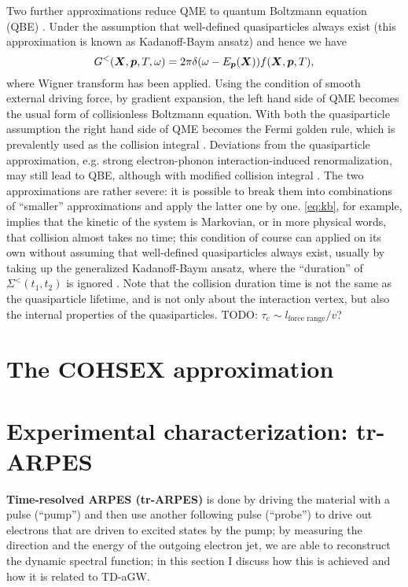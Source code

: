 \documentclass[hyperref, a4paper]{article}
\newcommand*{\concept}[1]{{\textbf{#1}}}
\begin{document}
Two further approximations reduce QME to quantum Boltzmann equation (QBE)
\cite{rammer1986quantum,haug2008quantum}.
Under the assumption that well-defined quasiparticles always exist
(this approximation is known as Kadanoff-Baym ansatz) and hence we have 
\begin{equation}
    G^<(\vb*{X}, \vb*{p}, T, \omega) = 2\pi \delta(\omega - E_{\vb*{p}}(\vb*{X})) f(\vb*{X}, \vb*{p}, T),
    \label{eq:kb}
\end{equation}
where Wigner transform has been applied.
Using the condition of smooth external driving force,
by gradient expansion, the left hand side of QME becomes 
the usual form of collisionless Boltzmann equation.
With both the quasiparticle assumption the right hand side of QME 
becomes the Fermi golden rule, 
which is prevalently used as the collision integral \cite{chen2022first}.
Deviations from the quasiparticle approximation,
e.g. strong electron-phonon interaction-induced renormalization, 
may still lead to QBE,
although with modified collision integral \cite{rammer1986quantum,wais2018quantum}.
The two approximations are rather severe: 
it is possible to break them into combinations of 
``smaller'' approximations
and apply the latter one by one. 
\eqref{eq:kb}, for example, implies that the kinetic of the system 
is Markovian, or in more physical words, 
that collision almost takes no time;
this condition of course can applied on its own 
without assuming that well-defined quasiparticles always exist,
usually by taking up the generalized Kadanoff-Baym ansatz,
where the ``duration'' of $\Sigma^<(t_1, t_2)$ is ignored
\cite{vspivcka2005long3}. 
Note that the collision duration time is not the same as the quasiparticle lifetime,
and is not only about the interaction vertex, 
but also the internal properties of the quasiparticles. TODO: $\tau_{\text{c}} \sim l_{\text{force range}} / v$?

\section{The COHSEX approximation} 

\section{Experimental characterization: tr-ARPES}

\concept{Time-resolved ARPES (tr-ARPES)} is done by 
driving the material with a pulse (``pump'')
and then use another following pulse (``probe'')
to drive out electrons that are driven to excited states by the pump;
by measuring the direction and the energy 
of the outgoing electron jet, 
we are able to reconstruct the dynamic spectral function; 
in this section I discuss how this is achieved 
and how it is related to TD-aGW.



\printbibliography
\end{document}
